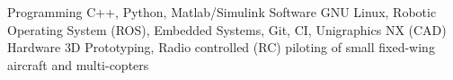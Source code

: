 

\begin{cvskills}

\vspace{-4pt}
  \cvskill
    {Programming} %
    {C++, Python, Matlab/Simulink} %
    \vspace{-4pt}
  \cvskill
    {Software} %
    {GNU Linux, Robotic Operating System (ROS), Embedded Systems, Git, CI, Unigraphics NX (CAD)} %
    \vspace{-4pt}
  \cvskill
    {Hardware}
    {3D Prototyping, Radio controlled (RC) piloting of small fixed-wing aircraft and multi-copters}


\end{cvskills}
